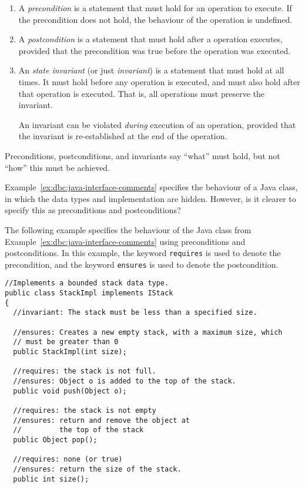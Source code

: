 \begin{enumerate}

 \item A \emph{precondition} is a statement that must hold for an operation to execute. If the precondition does not hold, the behaviour of the operation is undefined.

 \item A \emph{postcondition} is a statement that must hold after a operation executes, provided that the precondition was true before the operation was executed.

 \item An \emph{state invariant} (or just \emph{invariant}) is a statement that must hold at all times. It must hold before any operation is executed, and must also hold after that operation is executed. That is, all operations must preserve the invariant.

 An invariant can be violated \emph{during} execution of an operation, provided that the invariant is re-established at the end of the operation.

\end{enumerate}

Preconditions, postconditions, and invariants say ``what'' must hold, but not ``how'' this must be achieved.

Example~\ref{ex:dbc:java-interface-comments} specifies the behaviour of a Java class, in which the data types and implementation are hidden. However, is it clearer to specify this as preconditions and postconditions?

\begin{example}
\label{ex:dbc:java-interface-pre-post}
The following example specifies the behaviour of the Java class from Example~\ref{ex:dbc:java-interface-comments} using preconditions and postconditions. In this example, the keyword \texttt{requires} is used to denote the precondition, and the keyword \texttt{ensures} is used to denote the postcondition.

\lstset{language=Java}
\lstset{aboveskip=3mm}
\begin{lstlisting}
//Implements a bounded stack data type.
public class StackImpl implements IStack
{
  //invariant: The stack must be less than a specified size.

  //ensures: Creates a new empty stack, with a maximum size, which
  // must be greater than 0
  public StackImpl(int size);

  //requires: the stack is not full.
  //ensures: Object o is added to the top of the stack.
  public void push(Object o);

  //requires: the stack is not empty
  //ensures: return and remove the object at 
  //         the top of the stack
  public Object pop();

  //requires: none (or true)
  //ensures: return the size of the stack.
  public int size();
\end{lstlisting}

\end{example}


